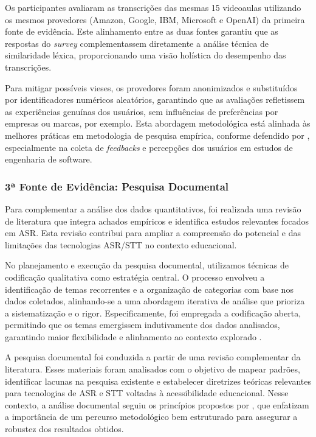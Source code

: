 Os participantes avaliaram as transcrições das mesmas 15 videoaulas utilizando os mesmos provedores (Amazon, Google, IBM, Microsoft e OpenAI) da primeira fonte de evidência. Este alinhamento entre as duas fontes garantiu que as respostas do \textit{survey} complementassem diretamente a análise técnica de similaridade léxica, proporcionando uma visão holística do desempenho das transcrições.

Para mitigar possíveis vieses, os provedores foram anonimizados e substituídos por identificadores numéricos aleatórios, garantindo que as avaliações refletissem as experiências genuínas dos usuários, sem influências de preferências por empresas ou marcas, por exemplo. Esta abordagem metodológica está alinhada às melhores práticas em metodologia de pesquisa empírica, conforme defendido por \cite{Sommerville2015}, especialmente na coleta de \textit{feedbacks} e percepções dos usuários em estudos de engenharia de software.

\subsubsection{3ª Fonte de Evidência: Pesquisa Documental}

Para complementar a análise dos dados quantitativos, foi realizada uma revisão de literatura que integra achados empíricos e identifica estudos relevantes focados em ASR. Esta revisão contribui para ampliar a compreensão do potencial e das limitações das tecnologias ASR/STT no contexto educacional.

No planejamento e execução da pesquisa documental, utilizamos técnicas de codificação qualitativa como estratégia central. O processo envolveu a identificação de temas recorrentes e a organização de categorias com base nos dados coletados, alinhando-se a uma abordagem iterativa de análise que prioriza a sistematização e o rigor. Especificamente, foi empregada a codificação aberta, permitindo que os temas emergissem indutivamente dos dados analisados, garantindo maior flexibilidade e alinhamento ao contexto explorado \cite{Martinelli2023}.

A pesquisa documental foi conduzida a partir de uma revisão complementar da literatura. Esses materiais foram analisados com o objetivo de mapear padrões, identificar lacunas na pesquisa existente e estabelecer diretrizes teóricas relevantes para tecnologias de ASR e STT voltadas à acessibilidade educacional. Nesse contexto, a análise documental seguiu os princípios propostos por , que enfatizam a importância de um percurso metodológico bem estruturado para assegurar a robustez dos resultados obtidos.


